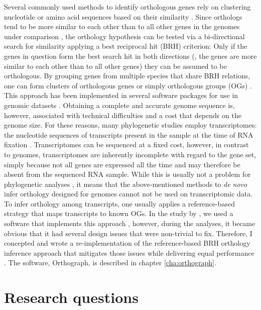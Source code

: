 Several commonly used methods to identify orthologous genes rely on
clustering nucleotide or amino acid sequences based on their similarity
\citep{Chen2007a}.  Since orthologs tend to be more similar to each other
than to all other genes in the genomes under comparison
\citep{Altenhoff2012a}, the orthology hypothesis can be tested via a
bi-directional search for similarity applying a best reciprocal hit
(BRH) criterion: Only if the genes in question form the best search hit
in both directions (\ie, the genes are more similar to each other than
to all other genes) they can be assumed to be orthologous.  By grouping
genes from multiple species that share BRH relations, one can form
clusters of orthologous genes or simply orthologous groups (OGs)
\citep{Altenhoff2012}.  This approach has been implemented in several
software packages for use in genomic datasets \citep{Li2003,
Tatusov2003, Berglund2008, Zdobnov2017}.  Obtaining a complete and
accurate genome sequence is, however, associated with technical
difficulties and a cost that depends on the genome size.  For these
reasons, many phylogenetic studies employ transcriptomes: the nucleotide
sequences of transcripts present in the sample at the time of RNA
fixation \citep{Wang2009}.  Transcriptomes can be sequenced at a fixed
cost, however, in contrast to genomes, transcriptomes are inherently
incomplete with regard to the gene set, simply because not all genes are
expressed all the time and may therefore be absent from the sequenced
RNA sample.  While this is usually not a problem for phylogenetic
analyses \citep{Wiens2006}, it means that the above-mentioned methods to
\emph{de novo} infer orthology designed for genomes cannot not be used
on transcriptomic data.  To infer orthology among transcripts, one
usually applies a reference-based strategy that maps transcripts to
known OGs.  In the study by \citet{Misof2014}, we used a software that
implements this approach \citep{Ebersberger2009}, however, during the
analyses, it became obvious that it had several design issues that were
non-trivial to fix.  Therefore, I concepted and wrote a
re-implementation of the reference-based BRH orthology inference
approach that mitigates those issues while delivering equal performance
\citep{Petersen2017}.  The software, Orthograph, is described in chapter
\ref{cha:orthograph}.

\section{Research questions}

